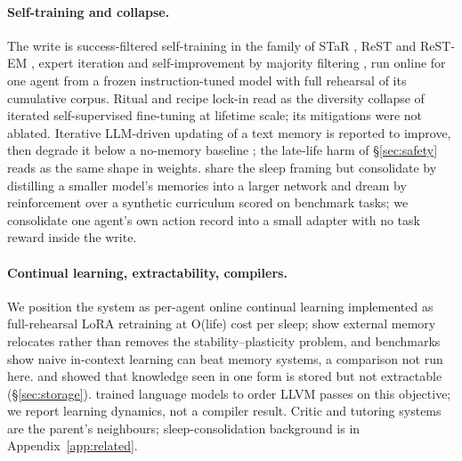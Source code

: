 \documentclass{article}
\begin{document}
\paragraph{Self-training and collapse.} The write is success-filtered self-training in the family of STaR \citep{zelikman2022star}, ReST and ReST-EM \citep{gulcehre2023rest,singh2023restem}, expert iteration \citep{anthony2017expert} and self-improvement by majority filtering \citep{huang2022lmsi}, run online for one agent from a frozen instruction-tuned model with full rehearsal of its cumulative corpus. Ritual and recipe lock-in read as the diversity collapse of iterated self-supervised fine-tuning \citep{shumailov2024collapse,alemohammad2023mad} at lifetime scale; its mitigations were not ablated. Iterative LLM-driven updating of a text memory is reported to improve, then degrade it below a no-memory baseline \citep{TODO-consolidation-collapse}; the late-life harm of \S\ref{sec:safety} reads as the same shape in weights. \citet{behrouz2026sleep} share the sleep framing but consolidate by distilling a smaller model's memories into a larger network and dream by reinforcement over a synthetic curriculum scored on benchmark tasks; we consolidate one agent's own action record into a small adapter with no task reward inside the write.

\paragraph{Continual learning, extractability, compilers.} We position the system as per-agent online continual learning implemented as full-rehearsal LoRA retraining at O(life) cost per sleep; \citet{hu2026whencl} show external memory relocates rather than removes the stability--plasticity problem, and benchmarks \citep{asawa2026clbench} show naive in-context learning can beat memory systems, a comparison not run here. \citet{allenzhu2023physics} and \citet{park2025newnews} showed that knowledge seen in one form is stored but not extractable (\S\ref{sec:storage}). \citet{cummins2023llmcompiler} trained language models to order LLVM passes on this objective; we report learning dynamics, not a compiler result. Critic and tutoring systems \citep{madaan2023selfrefine,gou2023critic} are the parent's neighbours; sleep-consolidation background is in Appendix~\ref{app:related}.
\end{document}
